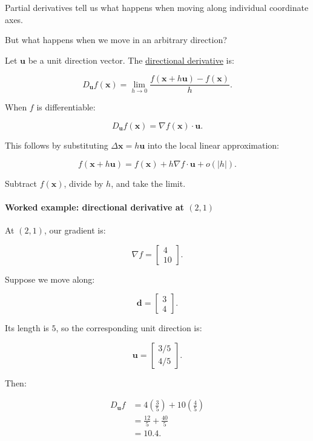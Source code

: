 Partial derivatives tell us what happens when moving along individual coordinate axes.

But what happens when we move in an arbitrary direction?

Let \(\mathbf u\) be a unit direction vector. The \hyperref[02-foundations-ii-ch021-multivariable-derivatives-and-sensitivity-1]{directional derivative} is:

\[
D_{\mathbf u}f(\mathbf x) = \lim_{h\to0} \frac{f(\mathbf x+h\mathbf u)-f(\mathbf x)}h.
\]

When \(f\) is differentiable:

\[
\boxed{ D_{\mathbf u}f(\mathbf x) = \nabla f(\mathbf x)\cdot\mathbf u }.
\]

This follows by substituting \(\Delta\mathbf x=h\mathbf u\) into the local linear approximation:

\[
f(\mathbf x+h\mathbf u) = f(\mathbf x)+h\nabla f\cdot\mathbf u+o(|h|).
\]

Subtract \(f(\mathbf x)\), divide by \(h\), and take the limit.

\paragraph{\texorpdfstring{Worked example: directional derivative at \((2,1)\)}{Worked example: directional derivative at (2,1)}}\label{02-foundations-ii-ch021-worked-example-directional-derivative-at-21}

At \((2,1)\), our gradient is:

\[
\nabla f= \begin{bmatrix}4\\10\end{bmatrix}.
\]

Suppose we move along:

\[
\mathbf d= \begin{bmatrix}3\\4\end{bmatrix}.
\]

Its length is \(5\), so the corresponding unit direction is:

\[
\mathbf u= \begin{bmatrix}3/5\\4/5\end{bmatrix}.
\]

Then:

\[
\begin{aligned} D_{\mathbf u}f &=4\left(\frac35\right)+10\left(\frac45\right)\\ &=\frac{12}{5}+\frac{40}{5}\\ &=\boxed{10.4}. \end{aligned}
\]

